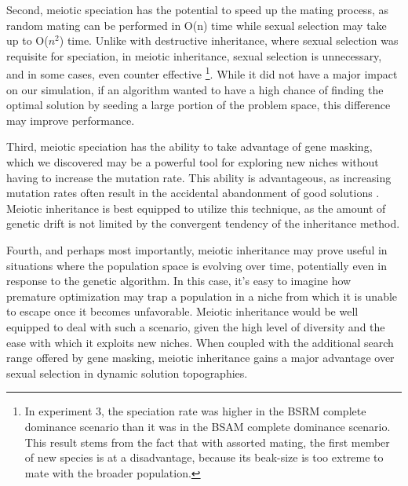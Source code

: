 \documentclass{article}
\begin{document}
Second, meiotic speciation has the potential to speed up the mating process, as random mating can be performed in O(n) time while sexual selection may take up to O($n^2$) time. Unlike with destructive inheritance, where sexual selection was requisite for speciation, in meiotic inheritance, sexual selection is unnecessary, and in some cases, even counter effective \footnote{In experiment 3, the speciation rate was higher in the BSRM complete dominance scenario than it was in the BSAM complete dominance scenario. This result stems from the fact that with assorted mating, the first member of new species is at a disadvantage, because its beak-size is too extreme to mate with the broader population.}. While it did not have a major impact on our simulation, if an algorithm wanted to have a high chance of finding the optimal solution by seeding a large portion of the problem space, this difference may improve performance. 

Third, meiotic speciation has the ability to take advantage of gene masking, which we discovered may be a powerful tool for exploring new niches without having to increase the mutation rate. This ability is advantageous, as increasing mutation rates often result in the accidental abandonment of good solutions \cite{TAGGING}. Meiotic inheritance is best equipped to utilize this technique, as the amount of genetic drift is not limited by the convergent tendency of the inheritance method.

Fourth, and perhaps most importantly, meiotic inheritance may prove useful in situations where the population space is evolving over time, potentially even in response to the genetic algorithm. In this case, it's easy to imagine how premature optimization may trap a population in a niche from which it is unable to escape once it becomes unfavorable. Meiotic inheritance would be well equipped to deal with such a scenario, given the high level of diversity and the ease with which it exploits new niches. When coupled with the additional search range offered by gene masking, meiotic inheritance gains a major advantage over sexual selection in dynamic solution topographies. 
\end{document}
